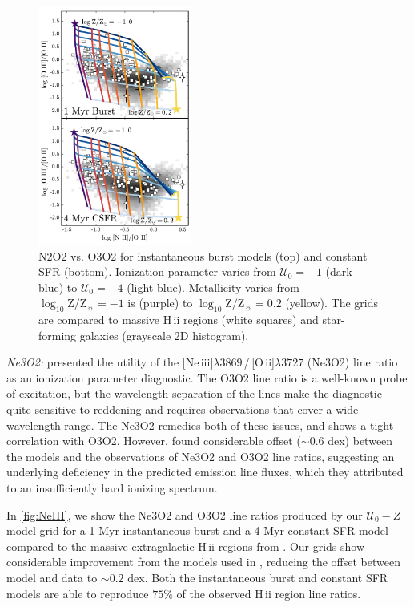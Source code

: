 \documentclass[twocolumn, tighten]{aastex61}
\newcommand{\Fig}[1]{\autoref{fig:#1}}
\newcommand{\logten}{\ensuremath{\log_{10}}}
\newcommand{\oii}{[O\,{\sc ii}]\xspace}
\newcommand{\neiii}{[Ne\,{\sc iii}]\xspace}
\newcommand{\hii}{H\,{\sc ii}\xspace}
\newcommand\lam[1]{\ensuremath{\lambda #1}}
\newcommand{\logZeq}[1]{\ensuremath{\logten \mathrm{Z}/\mathrm{Z}_{\sun} = #1}}
\newcommand{\U}{\ensuremath{\mathcal{U}_{0}}}
\begin{document}
\begin{figure}
  \begin{centering}
    \includegraphics[width=0.45\textwidth]{f18.pdf}
    \caption{N2O2 vs. O3O2 for instantaneous burst models (top) and constant SFR (bottom). Ionization parameter varies from $\U=-1$ (dark blue) to $\U=-4$ (light blue). Metallicity varies from \logZeq{-1} is (purple) to \logZeq{0.2} (yellow). The grids are compared to massive \hii regions (white squares) and star-forming galaxies (grayscale 2D histogram).}
    \label{fig:NIIOII}
  \end{centering}
\end{figure}

{\it Ne3O2:} \citet{Levesque14} presented the utility of the \neiii\lam{3869}\,/\,\oii\lam{3727} (Ne3O2) line ratio as an ionization parameter diagnostic. The O3O2 line ratio is a well-known probe of excitation, but the wavelength separation of the lines make the diagnostic quite sensitive to reddening and requires observations that cover a wide wavelength range. The Ne3O2 remedies both of these issues, and shows a tight correlation with O3O2. However, \citet{Levesque14} found considerable offset (${\sim}0.6$ dex) between the models and the observations of Ne3O2 and O3O2 line ratios, suggesting an underlying deficiency in the predicted emission line fluxes, which they attributed to an insufficiently hard ionizing spectrum. 

In \Fig{NeIII}, we show the Ne3O2 and O3O2 line ratios produced by our $\U-Z$ model grid for a 1 Myr instantaneous burst and a 4 Myr constant SFR model compared to the massive extragalactic \hii regions from \citet{vanzee98}. Our grids show considerable improvement from the models used in \citet{Levesque14}, reducing the offset between model and data to $\sim 0.2$ dex. Both the instantaneous burst and constant SFR models are able to reproduce $75\%$ of the observed \hii region line ratios.
\end{document}
